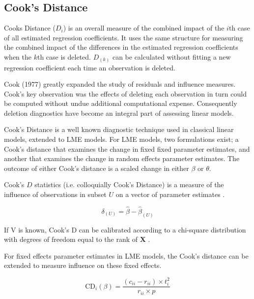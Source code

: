 \documentclass[12pt, a4paper]{article}
\begin{document}
\subsection{Cook's Distance}%
Cooks Distance ($D_{i}$) is an overall measure of the combined impact of the $i$th case of all estimated regression coefficients. It uses the same structure for measuring the combined impact of the differences in the estimated regression coefficients when the $k$th case is deleted. $D_{(k)}$ can be calculated without fitting
a new regression coefficient each time an observation is deleted.




Cook (1977) greatly expanded the study of residuals and influence measures. Cook's key observation was the effects of deleting each observation in turn could be computed without undue additional computational expense. Consequently deletion diagnostics have become an integral part of assessing linear models.


Cook's Distance is a well known diagnostic technique used in classical linear models, extended to LME models.  For LME models, two formulations exist; a Cook's distance that examines the change in fixed fixed parameter estimates, and another that examines the change in random effects parameter estimates. The outcome of either Cook's distance is a scaled change in either $\beta$ or $\theta$.


 Cook's $D$ statistics (i.e. colloquially Cook's Distance) is a measure of the influence of observations in subset $U$ on a vector of parameter estimates \citep{cook77}.


\[ \delta_{(U)} = \hat{\beta} - \hat{\beta}_{(U)}\]


If V is known, Cook's D can be calibrated according to a chi-square distribution with degrees of freedom equal to the rank of $\boldsymbol{X}$ \citep{cpj92}.





For fixed effects parameter estimates in LME models, the  Cook's distance can be extended to measure influence on these fixed effects.


\[
\mbox{CD}_{i}(\beta) = \frac{(c_{ii} - r_{ii}) \times t^2_{i}}{r_{ii} \times p}
\]
\end{document}
